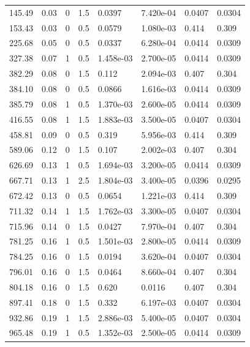 \documentclass[preview]{standalone}
\begin{document}
{{\begin{tabular}{L{1.2cm}C{1.2cm} C{0.3cm}C{0.5cm} C{1.4cm}C{1.4cm} C{1.4cm}C{1.4cm}}
  145.49  &  0.03  & 0     & 1.5 &  0.0397  & 7.420e-04  & 0.0407 &  0.0304   \\ 
  153.43  &  0.03  & 0     & 0.5 &  0.0579  & 1.080e-03  & 0.414 &  0.309   \\ 
  225.68  &  0.05  & 0     & 0.5 &  0.0337  & 6.280e-04  & 0.0414 &  0.0309   \\ 
  327.38  &  0.07  & 1     & 0.5 &  1.458e-03  & 2.700e-05  & 0.0414 &  0.0309   \\ 
  382.29  &  0.08  & 0     & 1.5 &  0.112  & 2.094e-03  & 0.407 &  0.304   \\ 
  384.10  &  0.08  & 0     & 0.5 &  0.0866  & 1.616e-03  & 0.0414 &  0.0309   \\ 
  385.79  &  0.08  & 1     & 0.5 &  1.370e-03  & 2.600e-05  & 0.0414 &  0.0309   \\ 
  416.55  &  0.08  & 1     & 1.5 &  1.883e-03  & 3.500e-05  & 0.0407 &  0.0304   \\ 
  458.81  &  0.09  & 0     & 0.5 &  0.319  & 5.956e-03  & 0.414 &  0.309   \\ 
  589.06  &  0.12  & 0     & 1.5 &  0.107  & 2.002e-03  & 0.407 &  0.304   \\ 
  626.69  &  0.13  & 1     & 0.5 &  1.694e-03  & 3.200e-05  & 0.0414 &  0.0309   \\ 
  667.71  &  0.13  & 1     & 2.5 &  1.804e-03  & 3.400e-05  & 0.0396 &  0.0295   \\ 
  672.42  &  0.13  & 0     & 0.5 &  0.0654  & 1.221e-03  & 0.414 &  0.309   \\ 
  711.32  &  0.14  & 1     & 1.5 &  1.762e-03  & 3.300e-05  & 0.0407 &  0.0304   \\ 
  715.96  &  0.14  & 0     & 1.5 &  0.0427  & 7.970e-04  & 0.407 &  0.304   \\ 
  781.25  &  0.16  & 1     & 0.5 &  1.501e-03  & 2.800e-05  & 0.0414 &  0.0309   \\ 
  784.25  &  0.16  & 0     & 1.5 &  0.0194  & 3.620e-04  & 0.0407 &  0.0304   \\ 
  796.01  &  0.16  & 0     & 1.5 &  0.0464  & 8.660e-04  & 0.407 &  0.304   \\ 
  804.18  &  0.16  & 0     & 1.5 &  0.620  & 0.0116  & 0.407 &  0.304   \\ 
  897.41  &  0.18  & 0     & 1.5 &  0.332  & 6.197e-03  & 0.0407 &  0.0304   \\ 
  932.86  &  0.19  & 1     & 1.5 &  2.886e-03  & 5.400e-05  & 0.0407 &  0.0304   \\ 
  965.48  &  0.19  & 1     & 0.5 &  1.352e-03  & 2.500e-05  & 0.0414 &  0.0309   \\ 

\end{tabular}}}
\end{document}
